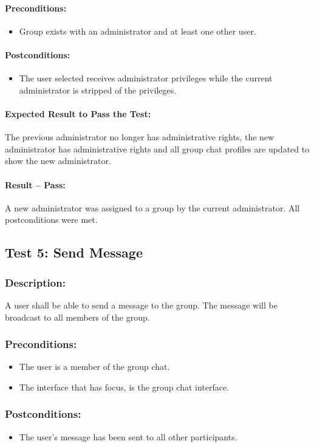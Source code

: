 \documentclass[11pt]{article}
\begin{document}
\paragraph{Preconditions:} 
\begin{itemize}
\item Group exists with an administrator and at least
one other user.
\end{itemize}
\paragraph{Postconditions:}
\begin{itemize}
\item The user selected receives administrator privileges while the current administrator is stripped of the privileges.
\end{itemize}
\paragraph{Expected Result to Pass the Test:}
The previous administrator no longer has administrative rights, the new administrator has administrative rights and all group chat profiles are updated to show the new administrator.
\paragraph{Result -- Pass:}
A new administrator was assigned to a group by the current administrator. All postconditions were met.

\subsection{Test 5: Send Message}
\subsubsection{Description:}
A user shall be able to send a message to the group.
The message will be broadcast to all members of the group.
\subsubsection{Preconditions:} 
\begin{itemize}
\item The user is a member of the group chat.
\item The interface that has focus, is the group chat interface.
\end{itemize}
\subsubsection{Postconditions:}
\begin{itemize}
\item The user's message has been sent to all other participants.
\end{itemize}
\end{document}
